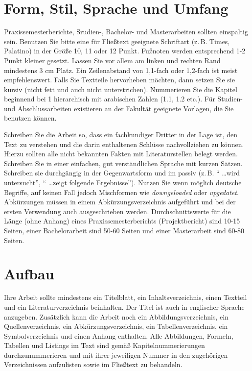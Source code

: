\documentclass[conference,final,a4paper]{IEEEtran}
\begin{document}
\section{Form, Stil, Sprache und Umfang}
Praxissemesterberichte, Srudien-, Bachelor- und Masterarbeiten sollten einspaltig sein. Benutzen Sie bitte eine für Fließtext geeignete Schriftart (z.\,B. Times, Palatino) in der Größe 10, 11 oder 12 Punkt. Fußnoten werden entsprechend 1-2 Punkt kleiner gesetzt. Lassen Sie vor allem am linken und rechten Rand mindestens 3 cm Platz. Ein Zeilenabstand von 1,1-fach oder 1,2-fach ist meist empfehlenswert. Falls Sie Textteile hervorheben möchten, dann setzen Sie sie kursiv (nicht fett und auch nicht unterstrichen). Nummerieren Sie die Kapitel beginnend bei 1 hierarchisch mit arabischen Zahlen (1.1, 1.2 etc.). Für Studien- und Abschlussarbeiten existieren an der Fakultät geeignete Vorlagen, die Sie benutzen können.

Schreiben Sie die Arbeit so, dass ein fachkundiger Dritter in der Lage ist, den Text zu verstehen und die darin enthaltenen Schlüsse nachvollziehen zu können. Hierzu sollten alle nicht bekannten Fakten mit Literaturstellen belegt werden. Schreiben Sie in einer einfachen, gut verständlichen Sprache mit kurzen Sätzen. Schreiben sie durchgängig in der Gegenwartsform und im passiv (z.\,B. "` \dots wird untersucht"', "` \dots zeigt folgende Ergebnisse"'). Nutzen Sie wenn möglich deutsche Begriffe, auf keinen Fall jedoch Mischformen wie \emph{downgeloaded} oder \emph{upgedatet}. Abkürzungen müssen in einem Abkürzungsverzeichnis aufgeführt und bei der ersten Verwendung auch ausgeschrieben werden. Durchschnittswerte für die Länge (ohne Anhang) eines Praxissemesterberichts (Projektbericht) sind 10-15 Seiten, einer Bachelorarbeit sind 50-60 Seiten und einer Masterarbeit sind 60-80 Seiten.

\section{Aufbau}

Ihre Arbeit sollte mindestens ein Titelblatt, ein Inhaltsverzeichnis, einen Textteil und ein Literaturverzeichnis beinhalten. Der Titel ist auch in englischer Sprache anzugeben. Zusätzlich kann die Arbeit noch ein Abbildungsverzeichnis, ein Quellenverzeichnis, ein Abkürzungsverzeichnis, ein Tabellenverzeichnis, ein Symbolverzeichnis und einen Anhang enthalten. Alle Abbildungen, Formeln, Tabellen und Listings im Text sind gemäß Kapitelnummerierungen durchzunummerieren und mit ihrer jeweiligen Nummer in den zugehörigen Verzeichnissen aufzulisten sowie im Fließtext zu behandeln.
\end{document}
